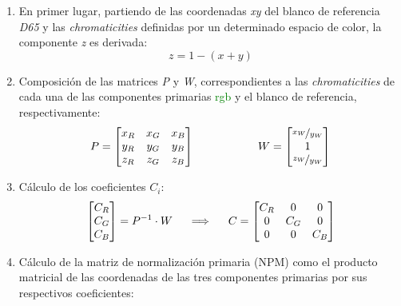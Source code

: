\documentclass[a4paper, 12pt]{report}
\begin{document}
 \begin{enumerate}
     \item  En primer lugar, partiendo de las coordenadas \textit{xy} del blanco de referencia \textit{D65} y las \textit{chromaticities} definidas por un determinado espacio de color, la componente \textit{z} es derivada:
         \begin{equation}
             z = 1 - (x + y)
         \end{equation}
     \item Composición de las matrices \textit{P} y \textit{W}, correspondientes a las \textit{chromaticities} de cada una de las componentes primarias \textcolor{green}{rgb} y el blanco de referencia, respectivamente:
        \begin{equation}
            P = \begin{bmatrix}
                    x_R & x_G & x_B \\
                    y_R & y_G & y_B \\
                    z_R & z_G & z_B
                \end{bmatrix}
            \hspace{2cm}
            W = \begin{bmatrix}
                    \nicefrac{x_W}{y_W}\\
                    1 \\
                    \nicefrac{z_W}{y_W}
            \end{bmatrix}
        \end{equation}
    \item Cálculo de los coeficientes $C_i$:
        \begin{equation}
            \begin{bmatrix}
                C_R\\
                C_G\\
                C_B
            \end{bmatrix} = P^{-1}\cdot W
            \hspace{0.5cm}\Longrightarrow\hspace{0.5cm}
            C = \begin{bmatrix}
                    C_R & 0 & 0 \\
                    0 & C_G & 0 \\
                    0 & 0 & C_B
                \end{bmatrix}
        \end{equation}
    \item Cálculo de la matriz de normalización primaria (NPM) como el producto matricial de las coordenadas de las tres componentes primarias por sus respectivos coeficientes:

\end{enumerate}
\end{document}
